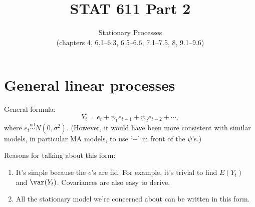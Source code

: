 \documentclass[12pt]{article}
\begin{document}
\title{STAT 611 Part 2}
\subtitle{Stationary Processes\\
\normalsize{(chapters 4, 6.1--6.3, 6.5--6.6, 7.1--7.5, 8, 9.1--9.6)}}
\maketitle

\section{General linear processes}

General formula:
\begin{equation}\label{eq:general-linear}
Y_t = e_t + \psi_1 e_{t-1} + \psi_2 e_{t-2} + \dotsb,
\end{equation}
where
$e_t \overset{\text{iid}}{\sim} N(0, \sigma^2)$.
(However, it would have been more consistent with similar models,
in particular MA models, to use
`$-$' in front of the $\psi$'s.)

Reasons for talking about this form:
\begin{enumerate}
\item It's simple because the $e$'s are iid.
    For example, it's trivial to find $E(Y_t)$ and $\var(Y_t)$.
    Covariances are also easy to derive.
\item All the stationary model we're concerned about
    can be written in this form.
\end{enumerate}
\end{document}
